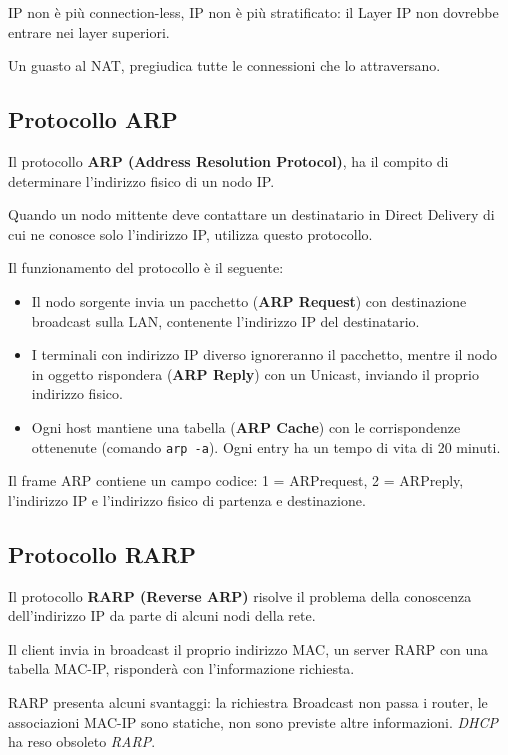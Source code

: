             IP non è più connection-less, IP non è più stratificato: il Layer IP non dovrebbe entrare nei layer superiori.
        
            Un guasto al NAT, pregiudica tutte le connessioni che lo attraversano.
        
    \subsection{Protocollo ARP}
        Il protocollo \textbf{ARP (Address Resolution Protocol)}, ha il compito di determinare l'indirizzo fisico di un nodo IP.
    
        Quando un nodo mittente deve contattare un destinatario in Direct Delivery di cui ne conosce solo l'indirizzo IP, utilizza questo protocollo.
    
        Il funzionamento del protocollo è il seguente:
        \begin{itemize}
            \item Il nodo sorgente invia un pacchetto (\textbf{ARP Request}) con destinazione broadcast sulla LAN, contenente l'indirizzo IP del destinatario.
            \item I terminali con indirizzo IP diverso ignoreranno il pacchetto, mentre il nodo in oggetto rispondera (\textbf{ARP Reply}) con un Unicast, inviando il proprio indirizzo fisico.
            \item Ogni host mantiene una tabella (\textbf{ARP Cache}) con le corrispondenze ottenenute (comando \verb:arp -a:). Ogni entry ha un tempo di vita di 20 minuti.
        \end{itemize}

        Il frame ARP contiene un campo codice: 1 = ARPrequest, 2 = ARPreply, l'indirizzo IP e l'indirizzo fisico di partenza e destinazione.

    \subsection{Protocollo RARP}
        Il protocollo \textbf{RARP (Reverse ARP)} risolve il problema della conoscenza dell'indirizzo IP da parte di alcuni nodi della rete.
    
        Il client invia in broadcast il proprio indirizzo MAC, un server RARP con una tabella MAC-IP, risponderà con l'informazione richiesta.
    
        RARP presenta alcuni svantaggi: la richiestra Broadcast non passa i router, le associazioni MAC-IP sono statiche, non sono previste altre informazioni. \textit{DHCP} ha reso obsoleto \textit{RARP}.

